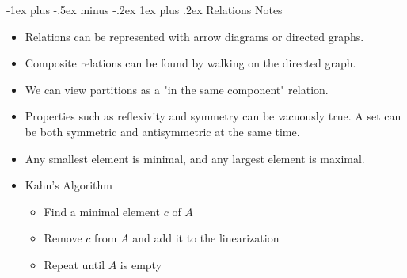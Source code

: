 \documentclass[10pt, portrait]{article}
\makeatletter
\renewcommand{\subsection}{\@startsection{subsection}{3}{0mm}%
                                {-1ex plus -.5ex minus -.2ex}%
                                {1ex plus .2ex}%
                                {\normalfont\small\bfseries}}%
\makeatother
\begin{document}
\begin{multicols*}{2}
\subsection{Relations Notes}
\begin{itemize}
    \item Relations can be represented with arrow diagrams or directed graphs.
    \item Composite relations can be found by walking on the directed graph.
    \item We can view partitions as a "in the same component" relation.
    \item Properties such as reflexivity and symmetry can be vacuously true. A set can be both symmetric and antisymmetric at the same time.
    \item Any smallest element is minimal, and any largest element is maximal.
    \item Kahn's Algorithm
    \begin{itemize}
        \item Find a minimal element $c$ of $A$
        \item Remove $c$ from $A$ and add it to the linearization
        \item Repeat until $A$ is empty
    \end{itemize}
\end{itemize}


\end{multicols*}
\end{document}
